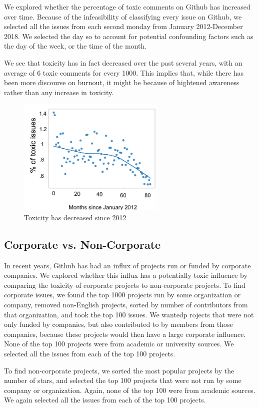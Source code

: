 \documentclass[conference]{IEEEtran}
\begin{document}
We explored whether the percentage of toxic comments on Github has increased over time. Because of the infeasibility of classifying every issue on Github, we selected all the issues from each second monday from January 2012-December 2018. We selected the day so to account for potential confounding factors such as the day of the week, or the time of the month. 

We see that toxicity has in fact decreased over the past several years, with an average of 6 toxic comments for every 1000. This implies that, while there has been more discourse on burnout, it might be because of hightened awareness rather than any increase in toxicity. 
 
\begin{figure} 
\includegraphics[width=7cm]{toxic_per_month.png}
\caption{Toxicity has decreased since 2012}
\end{figure}

\subsection{Corporate vs. Non-Corporate} 
In recent years, Github has had an influx of projects run or funded by corporate companies. We explored whether this influx has a potentially toxic influence by comparing the toxicity of corporate projects to non-corporate projects. To find corporate issues, we found the top 1000 projects run by some organization or company, removed non-English projects, sorted by number of contributors from that organization, and took the top 100 issues. We wantedp rojects that were not only funded by companies, but also contributed to by members from those companies, because these projects would then have a large corporate influence. None of the top 100 projects were from academic or university sources. We selected all the issues from each of the top 100 projects. 

To find non-corporate projects, we sorted the most popular projects by the number of stars, and selected the top 100 projects that were not run by some company or organization. Again, none of the top 100 were from academic sources. We again selected all the issues from each of the top 100 projects. 
\end{document}
